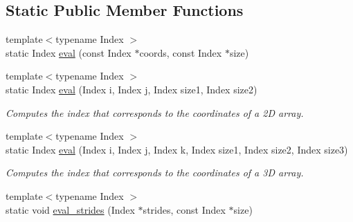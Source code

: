 \subsection*{Static Public Member Functions}
\begin{DoxyCompactItemize}
\item 
{\footnotesize template$<$typename Index $>$ }\\static Index \hyperlink{struct_d_o_1_1_offset_3_01_n_00_01_col_major_01_4_a156c0b86b1e62dfdfe3f957ef54c619c}{eval} (const Index $\ast$coords, const Index $\ast$size)
\item 
\hypertarget{struct_d_o_1_1_offset_3_01_n_00_01_col_major_01_4_affb094f082ace3f8d9949275933b888b}{{\footnotesize template$<$typename Index $>$ }\\static Index \hyperlink{struct_d_o_1_1_offset_3_01_n_00_01_col_major_01_4_affb094f082ace3f8d9949275933b888b}{eval} (Index i, Index j, Index size1, Index size2)}\label{struct_d_o_1_1_offset_3_01_n_00_01_col_major_01_4_affb094f082ace3f8d9949275933b888b}

\begin{DoxyCompactList}\small\item\em Computes the index that corresponds to the coordinates of a 2\-D array. \end{DoxyCompactList}\item 
\hypertarget{struct_d_o_1_1_offset_3_01_n_00_01_col_major_01_4_aa4c5802a75e5a07cc68e458b9242f8a2}{{\footnotesize template$<$typename Index $>$ }\\static Index \hyperlink{struct_d_o_1_1_offset_3_01_n_00_01_col_major_01_4_aa4c5802a75e5a07cc68e458b9242f8a2}{eval} (Index i, Index j, Index k, Index size1, Index size2, Index size3)}\label{struct_d_o_1_1_offset_3_01_n_00_01_col_major_01_4_aa4c5802a75e5a07cc68e458b9242f8a2}

\begin{DoxyCompactList}\small\item\em Computes the index that corresponds to the coordinates of a 3\-D array. \end{DoxyCompactList}\item 
\hypertarget{struct_d_o_1_1_offset_3_01_n_00_01_col_major_01_4_ad02911d67da0ad2bcf95bf5957f37553}{{\footnotesize template$<$typename Index $>$ }\\static void \hyperlink{struct_d_o_1_1_offset_3_01_n_00_01_col_major_01_4_ad02911d67da0ad2bcf95bf5957f37553}{eval\-\_\-strides} (Index $\ast$strides, const Index $\ast$size)}\label{struct_d_o_1_1_offset_3_01_n_00_01_col_major_01_4_ad02911d67da0ad2bcf95bf5957f37553}


\end{DoxyCompactItemize}
